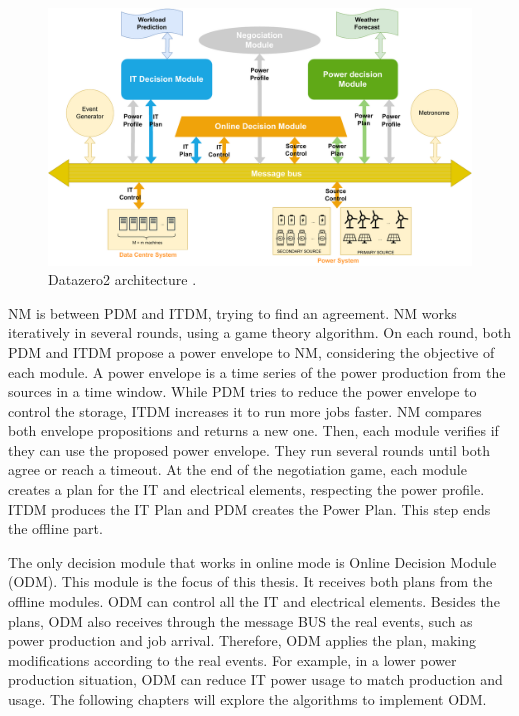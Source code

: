 \begin{figure}[!htb]
    \centering
    \includegraphics[scale=0.45]{Images/Model/model.pdf}
    \caption[Datazero2 architecture.]{Datazero2 architecture \cite{Datazero}.}
    \label{fig:model}
\end{figure}

NM is between PDM and ITDM, trying to find an agreement. NM works iteratively in several rounds, using a game theory algorithm. On each round, both PDM and ITDM propose a power envelope to NM, considering the objective of each module. A power envelope is a time series of the power production from the sources in a time window. While PDM tries to reduce the power envelope to control the storage, ITDM increases it to run more jobs faster. NM compares both envelope propositions and returns a new one. Then, each module verifies if they can use the proposed power envelope. They run several rounds until both agree or reach a timeout. At the end of the negotiation game, each module creates a plan for the IT and electrical elements, respecting the power profile. ITDM produces the IT Plan and PDM creates the Power Plan. This step ends the offline part. 

The only decision module that works in online mode is Online Decision Module (ODM). This module is the focus of this thesis. It receives both plans from the offline modules. ODM can control all the IT and electrical elements. Besides the plans, ODM also receives through the message BUS the real events, such as power production and job arrival. Therefore, ODM applies the plan, making modifications according to the real events. For example, in a lower power production situation, ODM can reduce IT power usage to match production and usage. The following chapters will explore the algorithms to implement ODM.

